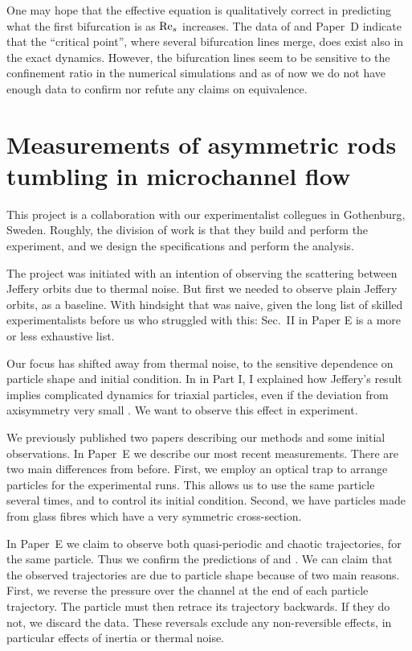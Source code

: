 \documentclass[thesis.tex]{subfiles}
\begin{document}
One may hope that the effective equation is qualitatively correct in predicting what the first bifurcation is as $\textrm{Re}_s$ increases. The data of \citet{rosen2015b} and Paper~D indicate that the ``critical point'', where several bifurcation lines merge, does exist also in the exact dynamics. However, the bifurcation lines seem to be sensitive to the confinement ratio in the numerical simulations and as of now we do not have enough data to confirm nor refute any claims on equivalence.

\chapter[Measurements of asymmetric rods]{Measurements of asymmetric rods tumbling in microchannel flow}

This project is a collaboration with our experimentalist collegues in Gothenburg, Sweden. Roughly, the division of work is that they build and perform the experiment, and we design the specifications and perform the analysis.

The project was initiated with an intention of observing the scattering between Jeffery orbits due to thermal noise. But first we needed to observe plain Jeffery orbits, as a baseline. With hindsight that was naive, given the long list of skilled experimentalists before us who struggled with this: Sec.~II in Paper E is a more or less exhaustive list. 

Our focus has shifted away from thermal noise, to the sensitive dependence on particle shape and initial condition. In  in Part I, I explained how Jeffery's result implies complicated dynamics for triaxial particles, even if the deviation from axisymmetry very small \cite{hinch1979,yarin1997}. We want to observe this effect in experiment.

We previously published two papers \cite{mishra2012,einarsson2013} describing our methods and some initial observations. In Paper~E we describe our most recent measurements. There are two main differences from before. First, we employ an optical trap to arrange particles for the experimental runs. This allows us to use the same particle several times, and to control its initial condition. Second, we have particles made from glass fibres which have a very symmetric cross-section.

In Paper~E we claim to observe both quasi-periodic and chaotic trajectories, for the same particle. Thus we confirm the predictions of \citet{hinch1979} and \citet{yarin1997}. We can claim that the observed trajectories are due to particle shape because of two main reasons. First, we reverse the pressure over the channel at the end of each particle trajectory. The particle must then retrace its trajectory backwards. If they do not, we discard the data. These reversals exclude any non-reversible effects, in particular effects of inertia or thermal noise.
\end{document}
